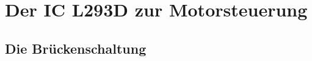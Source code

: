 %
%
%
%
%
%
%
%
%
%
%
%
%


\section{Der IC L293D zur Motorsteuerung}

\subsection{Die Brückenschaltung}

